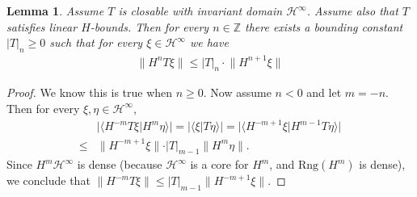 \documentclass[12pt,b5paper,notitlepage]{article}
\theoremstyle{definition}
\theoremstyle{plain}
\newtheorem{lm}[df]{Lemma}
\newcommand{\mc}{\mathcal}
\newcommand{\ovl}{\overline}
\newcommand{\Dom}{\scr{D}}
\newcommand{\bk}[1]{\langle {#1}\rangle}
\newcommand{\scr}{\mathscr}
\newcommand{\Nbb}{\mathbb N}
\newcommand{\Zbb}{\mathbb Z}
\newcommand{\Rng}{\mathrm{Rng}}
\numberwithin{equation}{section}
\begin{document}

\begin{lm}\label{lba7}
Assume $T$ is closable with invariant  domain $\mc H^\infty$. Assume also that $T$ satisfies linear $H$-bounds. Then for every $n\in\Zbb$ there exists a bounding constant $|T|_n\geq 0$ such that for every $\xi\in\mc H^\infty$ we have
\begin{align*}
\lVert H^nT\xi\lVert\leq |T|_n\cdot \lVert H^{n+1}\xi\lVert	
\end{align*}
\end{lm}

\begin{proof}
We know this is true when $n\geq 0$. Now assume $n<0$ and let $m=-n$. Then for every $\xi,\eta\in\mc H^\infty$,
\begin{align*}
&\big|\bk{H^{-m}T\xi|H^m\eta} \big|=\big|\bk{\xi|T\eta} \big|	=\big|\bk{H^{-m+1}\xi|H^{m-1}T\eta}  \big|\\
\leq&	\lVert H^{-m+1}\xi\lVert\cdot |T|_{m-1}\lVert H^m\eta\lVert.	
\end{align*}
Since $H^m\mc H^\infty$ is dense (because $\mc H^\infty$ is a core for $H^m$, and $\Rng(H^m)$ is dense), we conclude that $\lVert H^{-m}T\xi\lVert\leq |T|_{m-1}\lVert H^{-m+1}\xi\lVert$. 
\end{proof}
\end{document}
